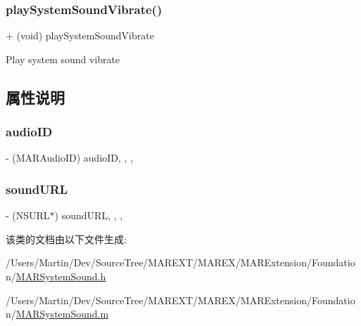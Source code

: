 \subsubsection{\texorpdfstring{play\+System\+Sound\+Vibrate()}{playSystemSoundVibrate()}}
{\footnotesize\ttfamily + (void) play\+System\+Sound\+Vibrate \begin{DoxyParamCaption}{ }\end{DoxyParamCaption}}

Play system sound vibrate 

\subsection{属性说明}
\mbox{\label{interface_m_a_r_system_sound_a69d3a85e05747da3e53df0d5f8138bd3}} 
\subsubsection{\texorpdfstring{audio\+ID}{audioID}}
{\footnotesize\ttfamily -\/ (M\+A\+R\+Audio\+ID) audio\+ID\hspace{0.3cm}{\ttfamily [read]}, {\ttfamily [write]}, {\ttfamily [nonatomic]}, {\ttfamily [assign]}}

\mbox{\label{interface_m_a_r_system_sound_a374f05fe291063a7884a57e50a7477a6}} 
\subsubsection{\texorpdfstring{sound\+U\+RL}{soundURL}}
{\footnotesize\ttfamily -\/ (N\+S\+U\+RL$\ast$) sound\+U\+RL\hspace{0.3cm}{\ttfamily [read]}, {\ttfamily [write]}, {\ttfamily [nonatomic]}, {\ttfamily [strong]}}



该类的文档由以下文件生成\+:\begin{DoxyCompactItemize}
\item 
/\+Users/\+Martin/\+Dev/\+Source\+Tree/\+M\+A\+R\+E\+X\+T/\+M\+A\+R\+E\+X/\+M\+A\+R\+Extension/\+Foundation/\hyperlink{_m_a_r_system_sound_8h}{M\+A\+R\+System\+Sound.\+h}\item 
/\+Users/\+Martin/\+Dev/\+Source\+Tree/\+M\+A\+R\+E\+X\+T/\+M\+A\+R\+E\+X/\+M\+A\+R\+Extension/\+Foundation/\hyperlink{_m_a_r_system_sound_8m}{M\+A\+R\+System\+Sound.\+m}\end{DoxyCompactItemize}
